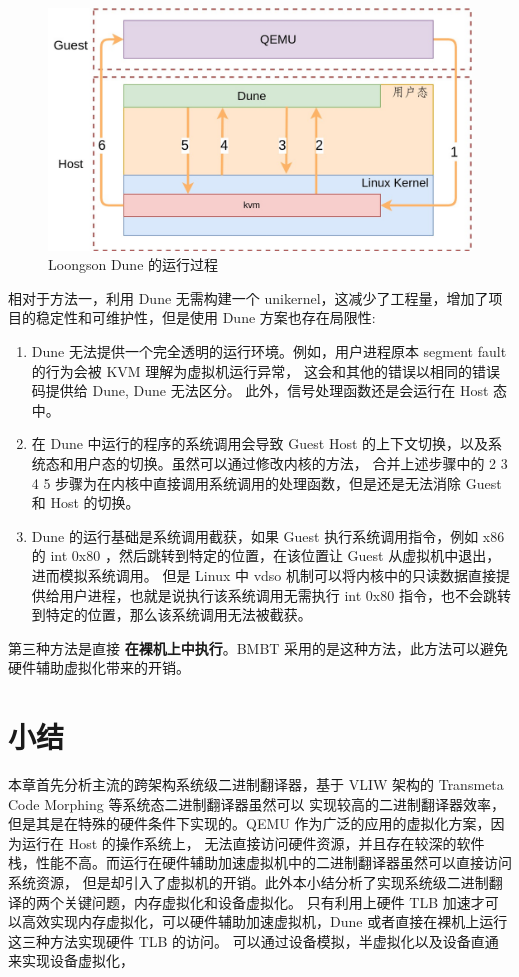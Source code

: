 \begin{figure}[!htbp]
	\centering
	\includegraphics[width=1.0\textwidth]{./images/dune.jpg}
	\caption{Loongson Dune 的运行过程}
	\label{fig:dune}
\end{figure}

相对于方法一，利用 Dune 无需构建一个 unikernel，这减少了工程量，增加了项目的稳定性和可维护性，但是使用 Dune 方案也存在局限性:
\begin{enumerate}
	\item Dune 无法提供一个完全透明的运行环境。例如，用户进程原本 segment fault 的行为会被 KVM 理解为虚拟机运行异常，
	      这会和其他的错误以相同的错误码提供给 Dune, Dune 无法区分。
	      此外，信号处理函数还是会运行在 Host 态中。
	\item 在 Dune 中运行的程序的系统调用会导致 Guest Host 的上下文切换，以及系统态和用户态的切换。虽然可以通过修改内核的方法，
	      合并上述步骤中的 2 3 4 5 步骤为在内核中直接调用系统调用的处理函数，但是还是无法消除 Guest 和 Host 的切换。
	\item Dune 的运行基础是系统调用截获，如果 Guest 执行系统调用指令，例如 x86 的 int 0x80 ，然后跳转到特定的位置，在该位置让 Guest 从虚拟机中退出，进而模拟系统调用。
	      但是 Linux 中 vdso 机制可以将内核中的只读数据直接提供给用户进程，也就是说执行该系统调用无需执行 int 0x80 指令，也不会跳转到特定的位置，那么该系统调用无法被截获。
\end{enumerate}

第三种方法是直接 \textbf{在裸机上中执行}。BMBT 采用的是这种方法，此方法可以避免硬件辅助虚拟化带来的开销。

\section{小结}
本章首先分析主流的跨架构系统级二进制翻译器，基于 VLIW 架构的 Transmeta Code Morphing 等系统态二进制翻译器虽然可以
实现较高的二进制翻译器效率，但是其是在特殊的硬件条件下实现的。QEMU 作为广泛的应用的虚拟化方案，因为运行在 Host 的操作系统上，
无法直接访问硬件资源，并且存在较深的软件栈，性能不高。而运行在硬件辅助加速虚拟机中的二进制翻译器虽然可以直接访问系统资源，
但是却引入了虚拟机的开销。此外本小结分析了实现系统级二进制翻译的两个关键问题，内存虚拟化和设备虚拟化。
只有利用上硬件 TLB 加速才可以高效实现内存虚拟化，可以硬件辅助加速虚拟机，Dune 或者直接在裸机上运行这三种方法实现硬件 TLB 的访问。
可以通过设备模拟，半虚拟化以及设备直通来实现设备虚拟化，

